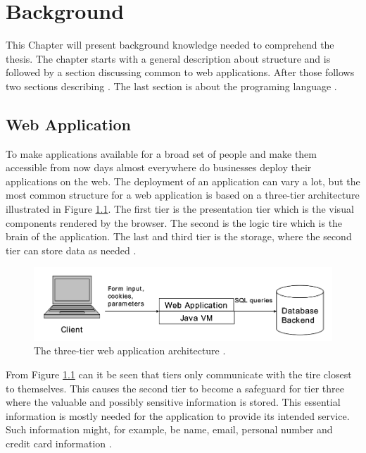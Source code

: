 \chapter{Background}
This Chapter will present background knowledge needed to comprehend the thesis. The chapter starts with a general description about \textit{} structure and is followed by a section discussing common \textit{} to web applications. After those follows two sections describing \textit{}. The last section is about the programing language \textit{}.



\section{Web Application}
\label{WebApplication}
To make applications available for a broad set of people and make them accessible from now days almost everywhere do businesses deploy their applications on the web. The deployment of an application can vary a lot, but the most common structure for a web application is based on a three-tier architecture illustrated in Figure \ref{fig:webApplication-Haldar}. The first tier is the presentation tier which is the visual components rendered by the browser. The second is the logic tire which is the brain of the application. The last and third tier is the storage, where the second tier can store data as needed \parencite{JustinClarke-Salt2009SIAa}.

\begin{figure}[H]
  \centering
  \includegraphics[width=\textwidth]{images/webApplication-Haldar.png}
  \caption{The three-tier web application architecture \cite{Haldar}.}
  \label{fig:webApplication-Haldar}
\end{figure}

From Figure \ref{fig:webApplication-Haldar} can it be seen that tiers only communicate with the tire closest to themselves. This causes the second tier to become a safeguard for tier three where the valuable and possibly sensitive information is stored. This essential information is mostly needed for the application to provide its intended service. Such information might, for example, be name, email, personal number and credit card information \parencite{JustinClarke-Salt2009SIAa}.

